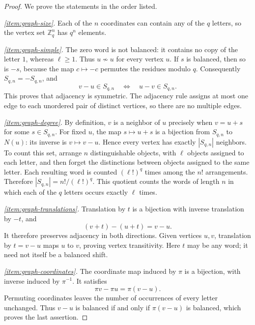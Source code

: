 \documentclass[11pt,a4paper]{article}
\numberwithin{equation}{section}
\numberwithin{figure}{section}
\numberwithin{table}{section}
\numberwithin{footnote}{section}
\theoremstyle{informal}\newtheorem*{informaltheorem}{Informal theorem}
\theoremstyle{definition}\newtheorem{example}{Example}[section]
\theoremstyle{remark}\newtheorem{remark}[theorem]{Remark}
\newcommand{\Z}{\mathbb Z}
\begin{document}
\begin{proof}
We prove the statements in the order listed.

\emph{\ref{item:graph-size}.}
Each of the \(n\) coordinates can contain any of the \(q\) letters,
so the vertex set \(\Z_q^n\) has \(q^n\) elements.

\emph{\ref{item:graph-simple}.}
The zero word is not balanced: it contains no copy of the letter
\(1\), whereas \(\ell\geq1\). Thus \(u\not\sim u\) for every
vertex \(u\). If \(s\) is balanced, then so is \(-s\), because
the map \(c\mapsto-c\) permutes the residues modulo \(q\).
Consequently \(S_{q,n}=-S_{q,n}\), and
\begin{equation}
 v-u\in S_{q,n}\quad\Longleftrightarrow\quad u-v\in S_{q,n}.
\end{equation}
This proves that adjacency is symmetric. The adjacency rule assigns
at most one edge to each unordered pair of distinct vertices, so
there are no multiple edges.

\emph{\ref{item:graph-degree}.}
By definition, \(v\) is a neighbor of \(u\) precisely when
\(v=u+s\) for some \(s\in S_{q,n}\). For fixed \(u\), the map
\(s\mapsto u+s\) is a bijection from \(S_{q,n}\) to \(N(u)\):
its inverse is \(v\mapsto v-u\). Hence every vertex has exactly
\(|S_{q,n}|\) neighbors. To count this set, arrange \(n\)
distinguishable objects, with \(\ell\) objects assigned to each
letter, and then forget the distinctions between objects assigned
to the same letter. Each resulting word is counted \((\ell!)^q\)
times among the \(n!\) arrangements. Therefore
\(|S_{q,n}|=n!/(\ell!)^q\). This quotient counts the words of
length \(n\) in which each of the \(q\) letters occurs exactly
\(\ell\) times.

\emph{\ref{item:graph-translations}.}
Translation by \(t\) is a bijection with inverse translation by
\(-t\), and
\begin{equation}
 (v+t)-(u+t)=v-u.
\end{equation}
It therefore preserves adjacency in both directions. Given vertices
\(u,v\), translation by \(t=v-u\) maps \(u\) to \(v\), proving
vertex transitivity. Here \(t\) may be any word; it need not itself
be a balanced shift.

\emph{\ref{item:graph-coordinates}.}
The coordinate map induced by \(\pi\) is a bijection, with inverse
induced by \(\pi^{-1}\). It satisfies
\begin{equation}
 \pi v-\pi u=\pi(v-u).
\end{equation}
Permuting coordinates leaves the number of occurrences of every
letter unchanged. Thus \(v-u\) is balanced if and only if
\(\pi(v-u)\) is balanced, which proves the last assertion.
\end{proof}
\end{document}

